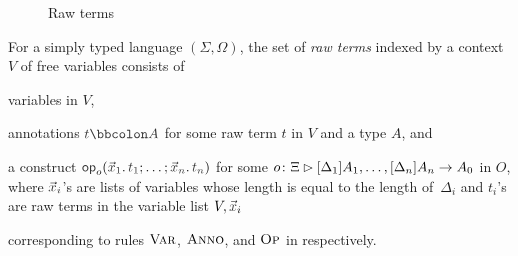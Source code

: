 \begin{definition}
\begin{figure}
  \centering
  \small
  \caption{Raw terms}
  \label{fig:raw-terms}
\end{figure}
  For a simply typed language $(\Sigma, \Omega)$, the set of \emph{raw terms} indexed by a context~$V$ of free variables consists of
  \begin{enumerate*}
    \item variables in $V$,
    \item annotations $\isTerm{t \annotate A}$ for some raw term $t$ in $V$ and a type $A$, and
    \item a construct $\tmOpts$ for some $o\colon \Xi \rhd [\Delta_{1}]A_{1}, \ldots, [\Delta_{n}]A_{n} \to A_0$ in $O$, where $\vars{x}_{\isTerm{i}}$'s are lists of variables whose length is equal to the length of~$\Delta_i$ and $t_i$'s are raw terms in the variable list $V, \vars{x}_i$
  \end{enumerate*}
  corresponding to rules $\textnormal{\textsc{Var}}$, $\textnormal{\textsc{Anno}}$, and $\textnormal{\textsc{Op}}$ in  respectively.
\end{definition}


